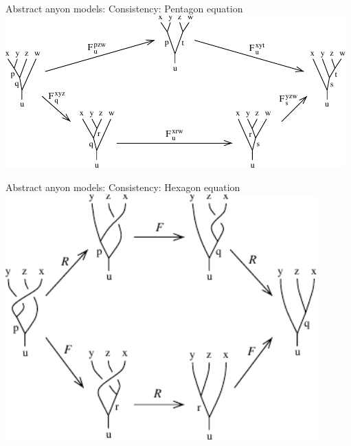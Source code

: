 \documentclass{beamer}
\begin{document}
\begin{frame}{Abstract anyon models: Consistency: Pentagon equation}
  \centering
  \includegraphics[width=\textwidth]{img/pentagon_diagram.pdf}
\end{frame}

\begin{frame}{Abstract anyon models: Consistency: Hexagon equation}
  \centering
  \vspace{1em}
  \includegraphics[width=0.9\textwidth]{img/hexagon_diagram.pdf}
\end{frame}
\end{document}
